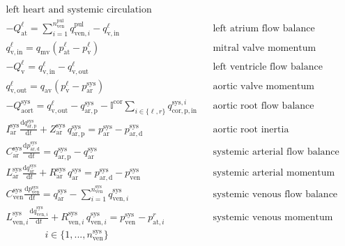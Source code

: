 \documentclass[a4paper,12pt]{report}
\begin{document}
\begin{equation}
\label{equation-syspul-1}
\begin{aligned}
&\text{left heart and systemic circulation} && \nonumber\\
&-Q_{\mathrm{at}}^{\ell} = \sum\limits_{i=1}^{n_{\mathrm{ven}}^{\mathrm{pul}}}q_{\mathrm{ven},i}^{\mathrm{pul}} - q_{\mathrm{v,in}}^{\ell} && \text{left atrium flow balance}\\
&q_{\mathrm{v,in}}^{\ell} = q_{\mathrm{mv}}(p_{\mathrm{at}}^{\ell}-p_{\mathrm{v}}^{\ell}) && \text{mitral valve momentum}\\
&-Q_{\mathrm{v}}^{\ell} = q_{\mathrm{v,in}}^{\ell} - q_{\mathrm{v,out}}^{\ell} && \text{left ventricle flow balance}\\
&q_{\mathrm{v,out}}^{\ell} = q_{\mathrm{av}}(p_{\mathrm{v}}^{\ell}-p_{\mathrm{ar}}^{\mathrm{sys}}) && \text{aortic valve momentum}\\
&-Q_{\mathrm{aort}}^{\mathrm{sys}} = q_{\mathrm{v,out}}^{\ell} - q_{\mathrm{ar,p}}^{\mathrm{sys}} - \mathbb{I}^{\mathrm{cor}}\sum\limits_{i\in\{\ell,r\}}q_{\mathrm{cor,p,in}}^{\mathrm{sys},i} && \text{aortic root flow balance}\\
&I_{\mathrm{ar}}^{\mathrm{sys}} \frac{\mathrm{d}q_{\mathrm{ar,p}}^{\mathrm{sys}}}{\mathrm{d}t} + Z_{\mathrm{ar}}^{\mathrm{sys}}\,q_{\mathrm{ar,p}}^{\mathrm{sys}}=p_{\mathrm{ar}}^{\mathrm{sys}}-p_{\mathrm{ar,d}}^{\mathrm{sys}} && \text{aortic root inertia}\nonumber\\
&C_{\mathrm{ar}}^{\mathrm{sys}} \frac{\mathrm{d}p_{\mathrm{ar,d}}^{\mathrm{sys}}}{\mathrm{d}t} = q_{\mathrm{ar,p}}^{\mathrm{sys}} - q_{\mathrm{ar}}^{\mathrm{sys}} && \text{systemic arterial flow balance}\\
&L_{\mathrm{ar}}^{\mathrm{sys}} \frac{\mathrm{d}q_{\mathrm{ar}}^{\mathrm{sys}}}{\mathrm{d}t} + R_{\mathrm{ar}}^{\mathrm{sys}}\,q_{\mathrm{ar}}^{\mathrm{sys}}=p_{\mathrm{ar,d}}^{\mathrm{sys}}-p_{\mathrm{ven}}^{\mathrm{sys}} && \text{systemic arterial momentum}\\
&C_{\mathrm{ven}}^{\mathrm{sys}} \frac{\mathrm{d}p_{\mathrm{ven}}^{\mathrm{sys}}}{\mathrm{d}t} = q_{\mathrm{ar}}^{\mathrm{sys}}-\sum\limits_{i=1}^{n_{\mathrm{ven}}^{\mathrm{sys}}}q_{\mathrm{ven},i}^{\mathrm{sys}}\ && \text{systemic venous flow balance}\\
&L_{\mathrm{ven},i}^{\mathrm{sys}} \frac{\mathrm{d}q_{\mathrm{ven},i}^{\mathrm{sys}}}{\mathrm{d}t} + R_{\mathrm{ven},i}^{\mathrm{sys}}\, q_{\mathrm{ven},i}^{\mathrm{sys}} = p_{\mathrm{ven}}^{\mathrm{sys}} - p_{\mathrm{at},i}^{r} && \text{systemic venous momentum}\nonumber\\
&\qquad\qquad i \in \{1,...,n_{\mathrm{ven}}^{\mathrm{sys}}\} && 
\end{aligned}
\end{equation}
\end{document}
